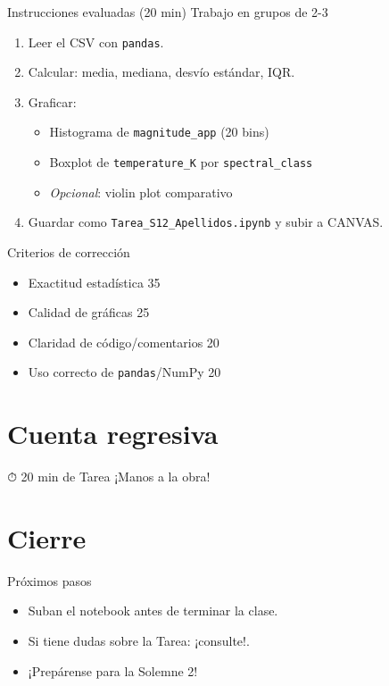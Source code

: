 \documentclass[10pt]{beamer}
\begin{document}
\begin{frame}{Instrucciones evaluadas (20 min)}
Trabajo en grupos de 2-3  
\begin{enumerate}
  \item Leer el CSV con \texttt{pandas}.
  \item Calcular: media, mediana, desvío estándar, IQR.
  \item Graficar:
        \begin{itemize}
          \item Histograma de \texttt{magnitude\_app} (20 bins)
          \item Boxplot de \texttt{temperature\_K} por \texttt{spectral\_class}
          \item \emph{Opcional}: violin plot comparativo
        \end{itemize}
  \item Guardar como \texttt{Tarea\_S12\_Apellidos.ipynb} y subir a CANVAS.
\end{enumerate}
\end{frame}

\begin{frame}{Criterios de corrección}
\begin{itemize}
  \item Exactitud estadística 35 %
  \item Calidad de gráficas 25 %
  \item Claridad de código/comentarios 20 %
  \item Uso correcto de \texttt{pandas}/NumPy 20 %
\end{itemize}
\end{frame}

\section{Cuenta regresiva}
\begin{frame}{⏱ 20 min de Tarea}
\huge\centering ¡Manos a la obra!
\end{frame}

\section{Cierre}
\begin{frame}{Próximos pasos}
\begin{itemize}
  \item Suban el notebook antes de terminar la clase.
  \item Si tiene dudas sobre la Tarea: ¡consulte!.
  \item ¡Prepárense para la Solemne 2!
\end{itemize}
\end{frame}
\end{document}
